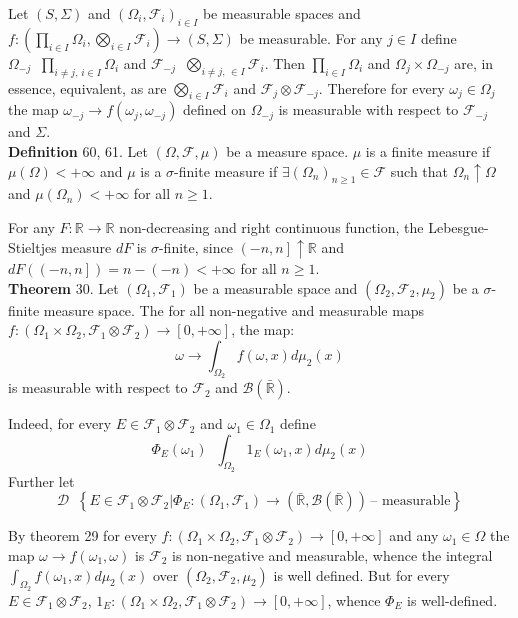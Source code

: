 \documentclass[a4paper]{article}
\newcommand{\obj}[1]{\left\{ #1 \right \}}
\newcommand{\clo}[1]{\left [ #1 \right ]}
\newcommand{\ploc}[1]{\left ( #1 \right ]}
\newcommand{\brac}[1]{\left ( #1 \right )}
\newcommand{\induc}[1]{\left . #1 \right \vert}
\newcommand{\Rbar}{{\bar{\mathbb{R}}}}
\newcommand{\Real}{\mathbb{R}}
\newcommand{\Zinf}{\clo{ 0, +\infty }}
\newcommand{\Dcal}{\mathcal{D}}
\newcommand{\Fcal}{\mathcal{F}}
\newcommand{\borel}[1]{\mathcal{B}\brac{#1}}
\newcommand{\defn}{\mathop{\overset{\Delta}{=}}\nolimits}
\begin{document}
Let $\brac{S, \Sigma}$ and $\brac{\Omega_i, \Fcal_i}_{i\in I}$ be measurable spaces and $f:\brac{\prod_{i\in I}\Omega_i, \bigotimes_{i\in I}\Fcal_i}\to\brac{S,\Sigma}$ be measurable. For any $j\in I$ define $\Omega_{-j} \defn \prod_{i\neq j,\,i\in I}\Omega_i$ and $\Fcal_{-j} \defn\bigotimes_{i\neq j,\,\in I} \Fcal_i$. Then $\prod_{i\in I}\Omega_i$ and $\Omega_j\times \Omega_{-j}$ are, in essence, equivalent, as are $\bigotimes_{i\in I} \Fcal_i$ and $\Fcal_j\otimes \Fcal_{-j}$. Therefore for every $\omega_j\in \Omega_j$ the map $\omega_{-j}\to f\brac{\omega_j, \omega_{-j}}$ defined on $\Omega_{-j}$ is measurable with respect to $\Fcal_{-j}$ and $\Sigma$.\\

\noindent \textbf{Definition} 60, 61.
Let $\brac{\Omega, \Fcal, \mu}$ be a measure space. $\mu$ is a finite measure if $\mu\brac{\Omega}<+\infty$ and $\mu$ is a $\sigma$-finite measure if $\exists \brac{\Omega_n}_{n\geq 1}\in \Fcal$ such that $\Omega_n\uparrow \Omega$ and $\mu\brac{\Omega_n}<+\infty$ for all $n\geq 1$.

For any $F:\Real\to\Real$ non-decreasing and right continuous function, the Lebesgue-Stieltjes measure $dF$ is $\sigma$-finite, since $\ploc{-n, n}\uparrow \Real$ and $dF\brac{\ploc{-n, n}} = n - \brac{-n}<+\infty$ for all $n\geq 1$.\\

\label{thm:fubini1} \noindent \textbf{Theorem} 30.
Let $\brac{\Omega_1, \Fcal_1}$ be a measurable space and $\brac{\Omega_2, \Fcal_2, \mu_2}$ be a $\sigma$-finite measure space. The for all non-negative and measurable maps $f:\brac{\Omega_1\times\Omega_2, \Fcal_1\otimes \Fcal_2}\to \Zinf$, the map:\[\omega \to \int_{\Omega_2} f\brac{\omega, x} d\mu_2\brac{x}\] is measurable with respect to $\Fcal_2$ and $\borel{\Rbar}$.

Indeed, for every $E\in \Fcal_1\otimes \Fcal_2$ and $\omega_1\in \Omega_1$ define \[\Phi_E\brac{\omega_1} \defn \int_{\Omega_2} 1_E\brac{\omega_1, x} d\mu_2\brac{x}\] Further let \[\Dcal\defn \obj{ \induc{ E\in \Fcal_1\otimes \Fcal_2 } \Phi_E:\brac{\Omega_1, \Fcal_1}\to \brac{ \Rbar, \borel{ \Rbar } }\, \text{-- measurable} } \]

By theorem 29 for every $f:\brac{\Omega_1\times\Omega_2, \Fcal_1\otimes \Fcal_2}\to \Zinf$ and any $\omega_1\in \Omega$ the map $\omega\to f\brac{\omega_1, \omega}$ is $\Fcal_2$ is non-negative and measurable, whence the integral $\int_{\Omega_2} f\brac{\omega_1, x} d\mu_2\brac{x}$ over $\brac{\Omega_2, \Fcal_2, \mu_2}$ is well defined. But for every $E\in \Fcal_1 \otimes \Fcal_2$, $1_E:\brac{\Omega_1\times\Omega_2, \Fcal_1\otimes \Fcal_2}\to \Zinf$, whence $\Phi_E$ is well-defined.
\end{document}
